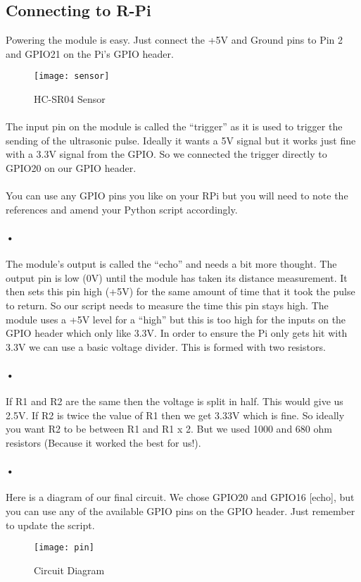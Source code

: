 \documentclass[11pt,a4paper]{article}
\begin{document}
		\subsection{Connecting to R-Pi}
			Powering the module is easy. Just connect the +5V and Ground pins to Pin 2 and GPIO21 on the Pi’s GPIO header.
			\begin{figure}[h]
				\centering
				\texttt{[image: sensor]}
				\caption{HC-SR04 Sensor}
			\end{figure}

\paragraph{}The input pin on the module is called the “trigger” as it is used to trigger the sending of the ultrasonic pulse. Ideally it wants a 5V signal but it works just fine with a 3.3V signal from the GPIO. So we connected the trigger directly to GPIO20 on our GPIO header.
\paragraph{}
You can use any GPIO pins you like on your RPi but you will need to note the references and amend your Python script accordingly.
\paragraph{•}
The module’s output is called the “echo” and needs a bit more thought. The output pin is low (0V) until the module has taken its distance measurement. It then sets this pin high (+5V) for the same amount of time that it took the pulse to return. So our script needs to measure the time this pin stays high. The module uses a +5V level for a “high” but this is too high for the inputs on the GPIO header which only like 3.3V. In order to ensure the Pi only gets hit with 3.3V we can use a basic voltage divider. This is formed with two resistors.
\paragraph{•}
If R1 and R2 are the same then the voltage is split in half. This would give us 2.5V. If R2 is twice the value of R1 then we get 3.33V which is fine. So ideally you want R2 to be between R1 and R1 x 2. But we used 1000 and 680 ohm resistors (Because it worked the best for us!).
\paragraph{•}
Here is a diagram of our final circuit. We chose GPIO20 and GPIO16 [echo], but you can use any of the available GPIO pins on the GPIO header. Just remember to update the script.
	\begin{figure}[H]
	 	\centering
		\texttt{[image: pin]}
		\caption{Circuit Diagram}
	\end{figure}
\end{document}
